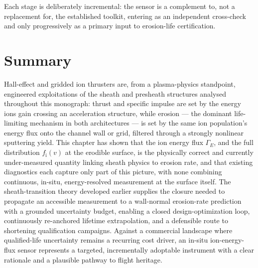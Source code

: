 Each stage is deliberately incremental: the sensor is a complement to, not a replacement for, the established toolkit, entering as an independent cross-check and only progressively as a primary input to erosion-life certification.

\section{Summary}

Hall-effect and gridded ion thrusters are, from a plasma-physics standpoint, engineered exploitations of the sheath and presheath structures analysed throughout this monograph: thrust and specific impulse are set by the energy ions gain crossing an acceleration structure, while erosion — the dominant life-limiting mechanism in both architectures — is set by the same ion population's energy flux onto the channel wall or grid, filtered through a strongly nonlinear sputtering yield. This chapter has shown that the ion energy flux $\Gamma_{E}$, and the full distribution $f_{\mathrm{i}}(v)$ at the erodible surface, is the physically correct and currently under-measured quantity linking sheath physics to erosion rate, and that existing diagnostics each capture only part of this picture, with none combining continuous, in-situ, energy-resolved measurement at the surface itself. The sheath-transition theory developed earlier supplies the closure needed to propagate an accessible measurement to a wall-normal erosion-rate prediction with a grounded uncertainty budget, enabling a closed design-optimization loop, continuously re-anchored lifetime extrapolation, and a defensible route to shortening qualification campaigns. Against a commercial landscape where qualified-life uncertainty remains a recurring cost driver, an in-situ ion-energy-flux sensor represents a targeted, incrementally adoptable instrument with a clear rationale and a plausible pathway to flight heritage.
